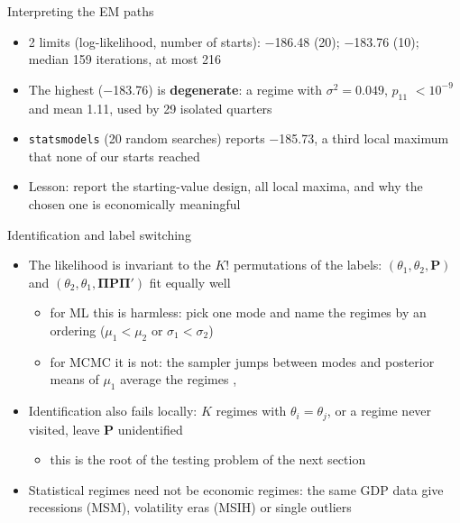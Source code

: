 \begin{frame}{Interpreting the EM paths}
\itemsize{\small}
\begin{itemize}
    \item 2 limits (log-likelihood, number of starts): \ensuremath{-}186.48 (20); \ensuremath{-}183.76 (10); median 159 iterations, at most 216
    \item The highest (\ensuremath{-}183.76) is \textbf{degenerate}: a regime with $\sigma^2 = 0.049$, $p_{11}$ $<10^{-9}$ and mean 1.11, used by 29 isolated quarters
    \item \texttt{statsmodels} (20 random searches) reports \ensuremath{-}185.73, a third local maximum that none of our starts reached
    \item Lesson: report the starting-value design, all local maxima, and why the chosen one is economically meaningful
\end{itemize}
\end{frame}

\begin{frame}{Identification and label switching}
\itemsize{\small}
\begin{itemize}
    \item The likelihood is invariant to the $K!$ permutations of the labels: $(\theta_1, \theta_2, \mathbf{P})$ and $(\theta_2, \theta_1, \mathbf{\Pi P\Pi}')$ fit equally well
    \begin{itemize}
        \item for ML this is harmless: pick one mode and name the regimes by an ordering ($\mu_1 < \mu_2$ or $\sigma_1 < \sigma_2$)
        \item for MCMC it is not: the sampler jumps between modes and posterior means of $\mu_1$ average the regimes , 
    \end{itemize}
    \item Identification also fails locally: $K$ regimes with $\theta_i = \theta_j$, or a regime never visited, leave $\mathbf{P}$ unidentified
    \begin{itemize}
        \item this is the root of the testing problem of the next section
    \end{itemize}
    \item Statistical regimes need not be economic regimes: the same GDP data give recessions (MSM), volatility eras (MSIH) or single outliers
\end{itemize}
\end{frame}


